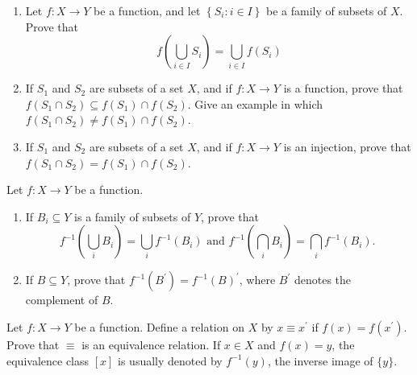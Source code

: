 \begin{questions}
\question
    \begin{enumerate}[label=(\alph*)]
        \item Let \(f: X \rightarrow Y\) be a function, and let \(\left\{S_i: i \in I\right\}\) be a family of subsets of \(X\). Prove that
\[
f\left(\bigcup_{i \in I} S_i\right)=\bigcup_{i \in I} f\left(S_i\right)
\]

        \item If \(S_1\) and \(S_2\) are subsets of a set \(X\), and if \(f: X \rightarrow Y\) is a function, prove that \(f\left(S_1 \cap S_2\right) \subseteq f\left(S_1\right) \cap f\left(S_2\right)\). Give an example in which \(f\left(S_1 \cap S_2\right) \neq f\left(S_1\right) \cap f\left(S_2\right)\).
        
        \item If \(S_1\) and \(S_2\) are subsets of a set \(X\), and if \(f: X \rightarrow Y\) is an injection, prove that \(f\left(S_1 \cap S_2\right)=f\left(S_1\right) \cap f\left(S_2\right)\).
    \end{enumerate}


\begin{solution}
    
\end{solution}


\question
    Let \(f: X \rightarrow Y\) be a function.
    \begin{enumerate}[label=(\alph*)]
        \item If \(B_i \subseteq Y\) is a family of subsets of \(Y\), prove that
\[
f^{-1}\left(\bigcup_i B_i\right)=\bigcup_i f^{-1}\left(B_i\right) \text { and } f^{-1}\left(\bigcap_i B_i\right)=\bigcap_i f^{-1}\left(B_i\right) \text {. }
\]
        \item If \(B \subseteq Y\), prove that \(f^{-1}\left(B^{\prime}\right)=f^{-1}(B)^{\prime}\), where \(B^{\prime}\) denotes the complement of \(B\).
    \end{enumerate}



\begin{solution}
    
\end{solution}


\question
    Let \(f: X \rightarrow Y\) be a function. Define a relation on \(X\) by \(x \equiv x^{\prime}\) if \(f(x)=f\left(x^{\prime}\right)\). Prove that \(\equiv\) is an equivalence relation. If \(x \in X\) and \(f(x)=y\), the equivalence class \([x]\) is usually denoted by \(f^{-1}(y)\), the inverse image of \(\{y\}\).

\begin{solution}
    
\end{solution}
\end{questions}